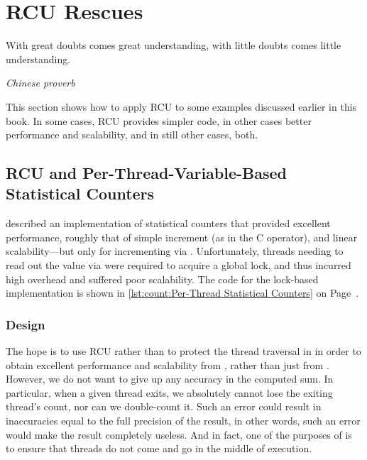 
\section{RCU Rescues}
\label{sec:together:RCU Rescues}
%
\epigraph{With great doubts comes great understanding, with little doubts
	  comes little understanding.}
	 {\emph{Chinese proverb}}

This section shows how to apply RCU to some examples discussed earlier
in this book.
In some cases, RCU provides simpler code, in other cases better
performance and scalability, and in still other cases, both.

\subsection{RCU and Per-Thread-Variable-Based Statistical Counters}
\label{sec:together:RCU and Per-Thread-Variable-Based Statistical Counters}

described an implementation of statistical counters that provided
excellent
performance, roughly that of simple increment (as in the C \co{++}
operator), and linear scalability---but only for incrementing
via .
Unfortunately, threads needing to read out the value via 
were required to acquire a global
lock, and thus incurred high overhead and suffered poor scalability.
The code for the lock-based implementation is shown in
\cref{lst:count:Per-Thread Statistical Counters} on
Page~\pageref{lst:count:Per-Thread Statistical Counters}.

\QuickQuizEnd

\subsubsection{Design}

The hope is to use RCU rather than  to protect the
thread traversal in  in order to obtain excellent
performance and scalability from , rather than just
from .
However, we do not want to give up any accuracy in the computed sum.
In particular, when a given thread exits, we absolutely cannot
lose the exiting thread's count, nor can we double-count it.
Such an error could result in inaccuracies equal to the full
precision of the result, in other words, such an error would
make the result completely useless.
And in fact, one of the purposes of  is to
ensure that threads do not come and go in the middle of 
execution.

